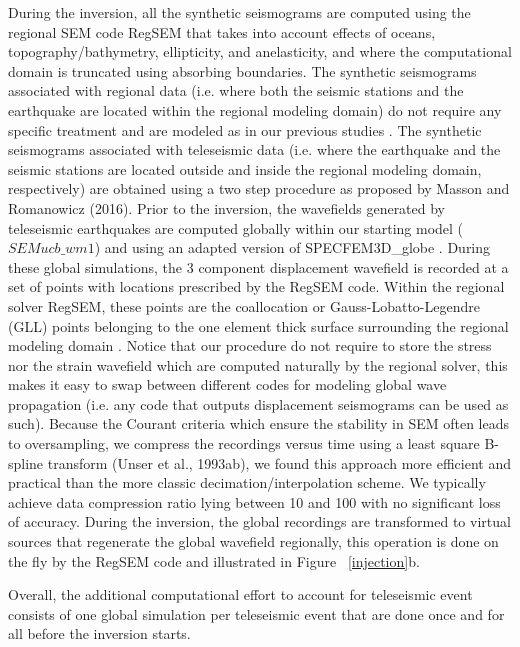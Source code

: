 \documentclass[12pt]{article}
\begin{document}
During the inversion, all the synthetic seismograms are computed using the regional SEM code RegSEM \citep{cupillard2012regsem} that takes into account effects of oceans, topography/bathymetry, ellipticity, and anelasticity, and where the computational domain is truncated using absorbing boundaries. 
The synthetic seismograms associated with regional data (i.e. where both the seismic stations and the earthquake are located within the regional modeling domain) do not require any specific treatment and are modeled as in our previous studies \citep[e.g.][]{yuan2014lithospheric}. 
The synthetic seismograms associated with teleseismic data (i.e. where the earthquake and the seismic stations are located outside and inside the regional modeling domain, respectively) are obtained using a two step procedure as proposed by Masson and Romanowicz (2016). 
Prior to the inversion, the wavefields generated by teleseismic earthquakes are computed globally within our starting model ($SEMucb\_wm1$) and using an adapted version of SPECFEM3D\_globe \citep{komatitsch2002spectrala}. 
During these global simulations, the 3 component displacement wavefield is recorded at a set of points with locations prescribed by the RegSEM code.
Within the regional solver RegSEM, these points are the coallocation or Gauss-Lobatto-Legendre (GLL) points belonging to the one element thick surface surrounding the regional modeling domain \citep[see][]{masson2013numerical}. 
Notice that our procedure do not require to store the stress nor the strain wavefield which are computed naturally by the regional solver, this makes it easy to swap between different codes for modeling global wave propagation (i.e. any code that outputs displacement seismograms can be used as such).
Because the Courant criteria which ensure the stability in SEM often leads to oversampling, we compress the recordings versus time using a least square B-spline transform (Unser et al., 1993ab), we found this  approach more efficient and practical than the more classic decimation/interpolation scheme.
We typically achieve data compression ratio lying between 10 and 100 with no significant loss of accuracy. 
During the inversion, the global recordings are transformed to virtual sources that regenerate the global wavefield regionally, this operation is done on the fly by the RegSEM code and illustrated in Figure ~\ref{injection}b. 

Overall, the additional computational effort to account for teleseismic event consists of one global simulation per teleseismic event that are done once and for all before the inversion starts.
\end{document}
